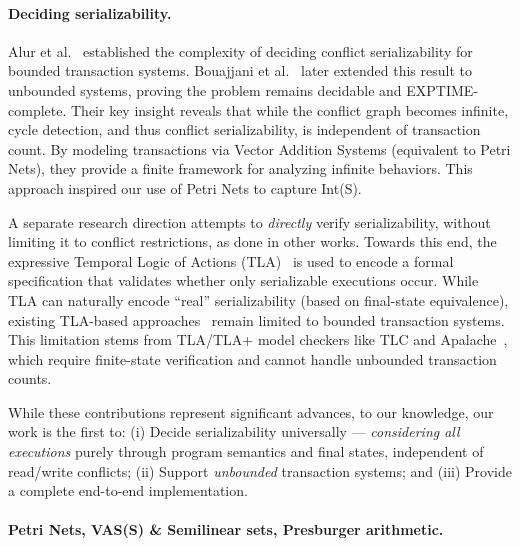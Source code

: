 \paragraph{Deciding serializability.}


Alur et al.~\cite{AlMcPe96} established the complexity of deciding conflict serializability for bounded transaction systems. Bouajjani et al.~\cite{BoEmEnHa13} later extended this result to unbounded systems, proving the problem remains decidable and EXPTIME-complete. Their key insight reveals that while the conflict graph becomes infinite, cycle detection, and thus conflict serializability, is independent of transaction count. By modeling transactions via Vector Addition Systems (equivalent to Petri Nets), they provide a finite framework for analyzing infinite behaviors. This approach inspired our use of Petri Nets to capture Int(S). 

A separate research direction attempts to \textit{directly} verify serializability, without limiting it to conflict restrictions, as done in other works. Towards this end, the expressive Temporal Logic of Actions (TLA)~\cite{La94} is used to encode a formal specification that validates whether only serializable executions occur. While TLA can naturally encode ``real'' serializability (based on final-state equivalence), existing TLA-based approaches~\cite{SoVaVi20, Ho24} remain limited to bounded transaction systems. This limitation stems from TLA/TLA+ model checkers like TLC and Apalache~\cite{YuMaLa99, KoKuTr19}, which require finite-state verification and cannot handle unbounded transaction counts.

%
While these contributions represent significant advances, to our knowledge, our work is the first to:
(i) Decide serializability universally --- \textit{considering all executions} purely through program semantics and final states, independent of read/write conflicts; 
(ii) Support \textit{unbounded} transaction systems; and
(iii) Provide a complete end-to-end implementation.

\paragraph{Petri Nets, VAS(S) \& Semilinear sets, Presburger arithmetic.}

